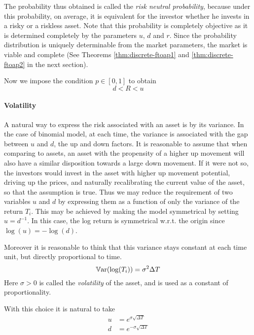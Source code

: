The probability thus obtained is called the \emph{risk neutral probability}, because under this probability, on average, it is equivalent for the investor whether he invests in a risky or a riskless asset. Note that this probability is completely objective as it is determined completely by the parameters $ u $, $ d $ and $ r $. Since the probability distribution is uniquely determinable from the market parameters, the market is viable and complete (See Theorems \ref{thm:discrete-ftoap1} and \ref{thm:discrete-ftoap2} in the next section).

Now we impose the condition $ p \in [0,1] $ to obtain
\begin{equation}
	\label{eq:discrete-feasibility-condition}
	d < R < u
\end{equation}


\paragraph{Volatility}
A natural way to express the risk associated with an asset is by its variance. In the case of binomial model, at each time, the variance is associated with the gap between $ u $ and $ d $, the up and down factors. It is reasonable to assume that when comparing to assets, an asset with the propensity of a higher up movement will also have a similar disposition towards a large down movement. If it were not so, the investors would invest in the asset with higher up movement potential, driving up the prices, and naturally recalibrating the current value of the asset, so that the assumption is true. Thus we may reduce the requirement of two variables $ u $ and $ d $ by expressing them as a function of only the variance of the return $ T_i $. This may be achieved by making the model symmetrical by setting $ u = d^{-1} $. In this case, the log return is symmetrical w.r.t. the origin since $ \log (u) = - \log (d) $.

Moreover it is reasonable to think that this variance stays constant at each time unit, but directly proportional to time.
\begin{equation*}
	\operatorname{\mathbb{V}\mathrm{ar}}(\log(T_i)) = \sigma^2 \Delta T
\end{equation*}
Here $ \sigma > 0 $ is called the \emph{volatility} of the asset, and is used as a constant of proportionality.

With this choice it is natural to take
\begin{subequations}
	\label{eq:discrete-ud}
	\begin{align}
		u &= e^{\sigma \sqrt{\Delta T}} \\
		d &= e^{- \sigma \sqrt{\Delta T}}
	\end{align}
\end{subequations}

